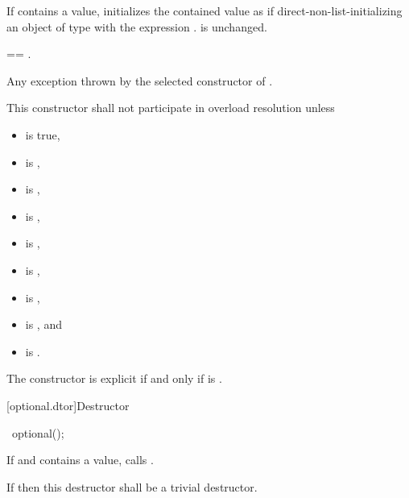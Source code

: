 \begin{itemdescr}
\pnum
\effects
If  contains a value,
initializes the contained value as if direct-non-list-initializing
an object of type  with the expression .
 is unchanged.

\pnum
\postconditions
{} == .

\pnum
\throws
Any exception thrown by the selected constructor of .

\pnum
\remarks
This constructor shall not participate in overload resolution unless
\begin{itemize}
\item {} is true,
\item {} is ,
\item {} is ,
\item {} is ,
\item {} is ,
\item {} is ,
\item {} is ,
\item {} is , and
\item {} is .
\end{itemize}
The constructor is explicit if and only if
 is .
\end{itemdescr}

[optional.dtor]{Destructor}

%
\begin{itemdecl}
~optional();
\end{itemdecl}

\begin{itemdescr}
\pnum
\effects
If  and  contains a value, calls .

\pnum
\remarks
If  then this destructor shall be a trivial destructor.
\end{itemdescr}


